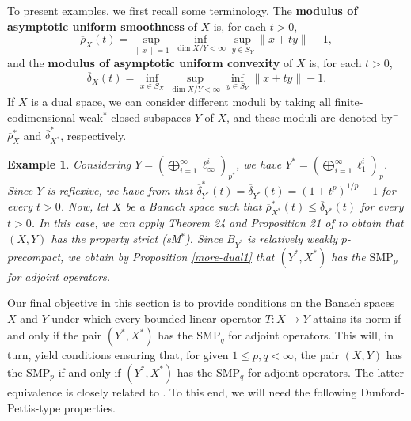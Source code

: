 \documentclass[12 pt]{article}%
\newtheorem{example}[theorem]{Example}
\newtheorem{final remark}[theorem]{Final Remark}
\newcommand{\norma}[1]{\| #1 \|}
\begin{document}
To present examples, we first recall some terminology. The {\bf modulus of asymptotic uniform smoothness} of $X$ is, for each $t > 0$, 
$$ \overline{\rho}_X(t) = \sup_{\norma{x} = 1} \inf_{\dim X/Y < \infty} \sup_{y \in S_Y} \norma{x+ty} - 1, $$
and the {\bf modulus of asymptotic uniform convexity} of $X$ is, for each $t > 0$, 
$$ \overline{\delta}_X  (t) = \inf_{x \in S_X} \sup_{\dim X/Y < \infty} \inf_{y \in S_Y} \norma{x+ty} - 1. $$
If $X$ is a dual space, we can consider different moduli by taking all finite-codimensional
weak$^*$ closed subspaces $Y$ of $X$, and these moduli are denoted by¯$\overline{\rho}_{X}^*$ and $\overline{\delta}_{X^*}^*$, respectively.


\begin{example} \label{more-dual2} \rm 
Considering $Y = (\bigoplus_{i=1}^{\infty}\ell_{\infty}^{i})_{p^*}$, we have $Y^* = (\bigoplus_{i=1}^{\infty}\ell_{1}^{i})_{p}$. Since $Y$ is reflexive, we have from \cite[Example 2.6(i)]{garcia-lirola} that
$ \overline{\delta}_{Y^*}^*(t) = \overline{\delta}_{Y^*}(t) = (1+t^p)^{1/p} - 1 $
for every $t > 0$. 
Now, let $X$ be a Banach space such that $\overline{\rho}^*_{X^*}(t) \leq \overline{\delta}_{Y^*}(t)$ for every $t > 0$. 
In this case, we can apply Theorem 24 and Proposition 21 of \cite{han} to obtain that  $(X, Y)$ has the property strict (sM$^*$). Since $B_{Y^*}$ is relatively weakly $p$-precompact, we obtain by Proposition \ref{more-dual1} that $(Y^*, X^*)$ has the $\mathrm{SMP}_p$ for adjoint operators. 
\end{example}

Our final objective in this section is to provide conditions on the Banach spaces $X$ and $Y$ under which every bounded linear operator
$T:X\to Y$ attains its norm if and only if the pair $(Y^\ast,X^\ast)$ has the $\mathrm{SMP}_q$ for adjoint operators. This will, in turn,
yield conditions ensuring that, for given $1\leq p,q<\infty$, the pair $(X,Y)$ has the $\mathrm{SMP}_p$ if and only if $(Y^\ast,X^\ast)$ has the $\mathrm{SMP}_q$ for adjoint operators. The latter equivalence is
closely related to \cite[Question 5.12]{garcia-lirola}. To this end, we will need the following Dunford-Pettis-type properties.
\end{document}
